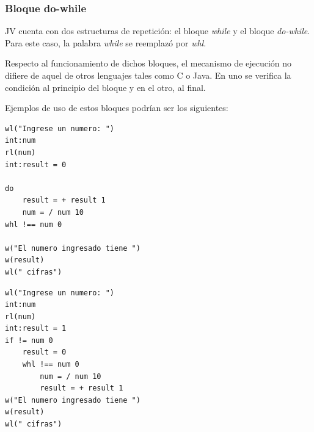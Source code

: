 \documentclass[spanish]{article}
\begin{document}
            \subsubsection{Bloque do-while}
                \par JV cuenta con dos estructuras de repetición: el bloque \textit{while} y el bloque \textit{do-while}. Para este caso, la palabra \textit{while} se reemplazó por \textit{whl}.
                \par Respecto al funcionamiento de dichos bloques, el mecanismo de ejecución no difiere de aquel de otros lenguajes tales como C o Java. En uno se verifica la condición al principio del bloque y en el otro, al final.
                \par Ejemplos de uso de estos bloques podrían ser los siguientes:

                \begin{lstlisting}
wl("Ingrese un numero: ")
int:num
rl(num)
int:result = 0

do
    result = + result 1
    num = / num 10
whl !== num 0

w("El numero ingresado tiene ")
w(result)
wl(" cifras")
                \end{lstlisting}
                \begin{lstlisting}
wl("Ingrese un numero: ")
int:num
rl(num)
int:result = 1
if != num 0
    result = 0
    whl !== num 0
        num = / num 10
        result = + result 1
w("El numero ingresado tiene ")
w(result)
wl(" cifras")
                \end{lstlisting}
\end{document}
